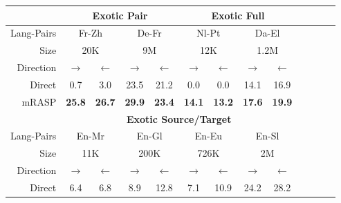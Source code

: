 \documentclass[11pt,a4paper]{article}
\newcommand{\mf}[1]{\multicolumn{2}{c}{ #1}}
\newcommand{\smf}[1]{\multicolumn{2}{c}{#1}}
\newcommand{\method}{mRASP\xspace}
\newcommand{\baseline}{Direct}
\begin{document}
\begin{table*}[ht]
\begin{center}
\begin{tabular}{rcccccccccccc}
\toprule
& \multicolumn{4}{c}{\textbf{Exotic Pair}} & \multicolumn{4}{c}{\textbf{Exotic Full}} \\
\midrule

Lang-Pairs& 
\mf{Fr-Zh} &
\mf{De-Fr} &
\mf{Nl-Pt} &
\mf{Da-El} & 

\\



Size &
\smf{20K}  & 
\smf{9M}  & 
\smf{12K} & 
\smf{1.2M} & 

\\


Direction & 
 $\rightarrow$ &$\leftarrow$ &

 $\rightarrow$ &$\leftarrow$ &

 $\rightarrow$ &$\leftarrow$ &

 $\rightarrow$ &$\leftarrow$ \\



\midrule
\baseline &
0.7 & 3.0 & 23.5 & 21.2 &  0.0 & 0.0 & 14.1 & 16.9 

\\


\method &
\bf 25.8 & \bf 26.7 &
 \bf 29.9 & \bf 23.4 &
\bf 14.1 & \bf 13.2 &
\bf 17.6 &\bf 19.9

\\
\midrule
\midrule

& \multicolumn{8}{c}{\textbf{Exotic Source/Target}} \\
\midrule


Lang-Pairs &
\mf{En-Mr} &
\mf{En-Gl} &
\mf{En-Eu} &
\mf{En-Sl}
\\


Size &
\smf{11K} & 
\smf{200K} & 
\smf{726K} & 
\smf{2M}
\\


 Direction & 
 $\rightarrow$ &$\leftarrow$ &

 $\rightarrow$ &$\leftarrow$ &

 $\rightarrow$ &$\leftarrow$ &

 $\rightarrow$ &$\leftarrow$ \\



\midrule
\baseline &
6.4 & 6.8 & 8.9 & 12.8 & 7.1 & 10.9 & 24.2 & 28.2  

\\



\end{tabular}
\end{center}
\end{table*}
\end{document}
